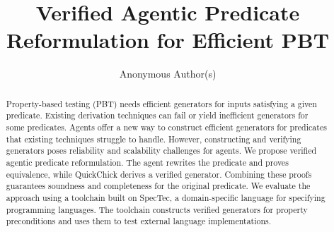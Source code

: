 \documentclass[acmsmall,screen,review,anonymous,nonacm]{acmart}
\begin{document}
\title{Verified Agentic Predicate Reformulation for Efficient PBT}

\author{Anonymous Author(s)}

\renewcommand{\shortauthors}{Anonymous}

\begin{abstract}
Property-based testing (PBT) needs efficient generators for inputs satisfying a
given predicate.
Existing derivation techniques can fail or yield inefficient generators for some
predicates.
Agents offer a new way to construct efficient generators for predicates that
existing techniques struggle to handle.
However, constructing and verifying generators poses reliability and scalability
challenges for agents.
We propose verified agentic predicate reformulation.
The agent rewrites the predicate and proves equivalence, while QuickChick derives
a verified generator.
Combining these proofs guarantees soundness and completeness for the original
predicate.
We evaluate the approach using a toolchain built on SpecTec, a domain-specific
language for specifying programming languages.
The toolchain constructs verified generators for property preconditions and uses
them to test external language implementations.
\end{abstract}

\maketitle












\end{document}

